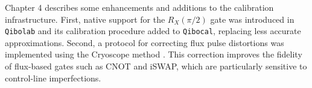 Chapter 4 describes some enhancements and additions to the calibration infrastructure. 
First, native support for the $R_X(\pi/2)$ gate was introduced in \texttt{Qibolab} and its calibration procedure added to \texttt{Qibocal}, replacing less accurate approximations. 
Second, a protocol for correcting flux pulse distortions was implemented using the Cryoscope method \cite{rol_time-domain_2020}. 
This correction improves the fidelity of flux-based gates such as CNOT and iSWAP, which are particularly sensitive to control-line imperfections.

